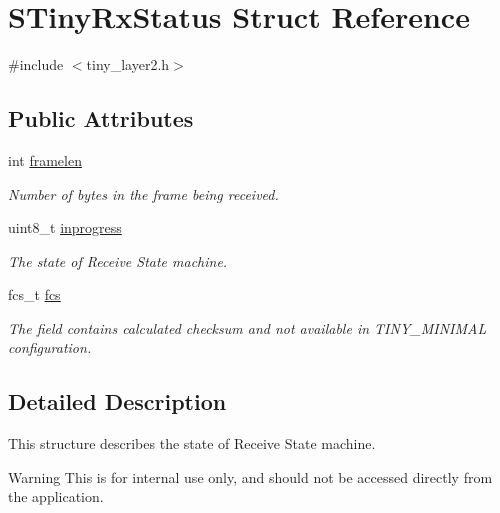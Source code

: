 \hypertarget{structSTinyRxStatus}{}\section{S\+Tiny\+Rx\+Status Struct Reference}
\label{structSTinyRxStatus}


{\ttfamily \#include $<$tiny\+\_\+layer2.\+h$>$}

\subsection*{Public Attributes}
\begin{DoxyCompactItemize}
\item 
int \hyperlink{structSTinyRxStatus_ad9f6055b8e74f10894c48ff2247f51c4}{framelen}
\begin{DoxyCompactList}\small\item\em Number of bytes in the frame being received. \end{DoxyCompactList}\item 
\mbox{\label{structSTinyRxStatus_aaa956a3e43e12753ef43b76bb51d298e}} 
uint8\+\_\+t \hyperlink{structSTinyRxStatus_aaa956a3e43e12753ef43b76bb51d298e}{inprogress}
\begin{DoxyCompactList}\small\item\em The state of Receive State machine. \end{DoxyCompactList}\item 
\mbox{\label{structSTinyRxStatus_a609d1743d90eff27819207961850ee48}} 
fcs\+\_\+t \hyperlink{structSTinyRxStatus_a609d1743d90eff27819207961850ee48}{fcs}
\begin{DoxyCompactList}\small\item\em The field contains calculated checksum and not available in T\+I\+N\+Y\+\_\+\+M\+I\+N\+I\+M\+AL configuration. \end{DoxyCompactList}\end{DoxyCompactItemize}


\subsection{Detailed Description}
This structure describes the state of Receive State machine. \begin{DoxyWarning}{Warning}
This is for internal use only, and should not be accessed directly from the application. 
\end{DoxyWarning}


